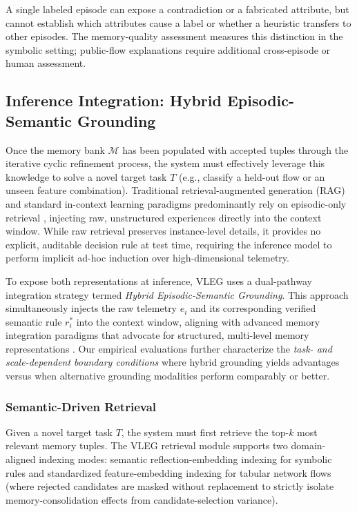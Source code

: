 \documentclass[journal]{IEEEtran}
\theoremstyle{definition}
\theoremstyle{remark}
\begin{document}
A single labeled episode can expose a contradiction or a fabricated attribute, but cannot establish which attributes cause a label or whether a heuristic transfers to other episodes. The memory-quality assessment measures this distinction in the symbolic setting; public-flow explanations require additional cross-episode or human assessment.

\subsection{Inference Integration: Hybrid Episodic-Semantic Grounding}
Once the memory bank $\mathcal{M}$ has been populated with accepted tuples through the iterative cyclic refinement process, the system must effectively leverage this knowledge to solve a novel target task $T$ (e.g., classify a held-out flow or an unseen feature combination). Traditional retrieval-augmented generation (RAG) and standard in-context learning paradigms predominantly rely on episodic-only retrieval \cite{lewis2020retrieval, zhang2022active}, injecting raw, unstructured experiences directly into the context window. While raw retrieval preserves instance-level details, it provides no explicit, auditable decision rule at test time, requiring the inference model to perform implicit ad-hoc induction over high-dimensional telemetry.

To expose both representations at inference, VLEG uses a dual-pathway integration strategy termed \textit{Hybrid Episodic-Semantic Grounding}. This approach simultaneously injects the raw telemetry $e_i$ and its corresponding verified semantic rule $r_i^*$ into the context window, aligning with advanced memory integration paradigms that advocate for structured, multi-level memory representations \cite{wu2025from, zhang2024survey}. Our empirical evaluations further characterize the \emph{task- and scale-dependent boundary conditions} where hybrid grounding yields advantages versus when alternative grounding modalities perform comparably or better.

\subsubsection{Semantic-Driven Retrieval}
Given a novel target task $T$, the system must first retrieve the top-$k$ most relevant memory tuples. The VLEG retrieval module supports two domain-aligned indexing modes: semantic reflection-embedding indexing for symbolic rules and standardized feature-embedding indexing for tabular network flows (where rejected candidates are masked without replacement to strictly isolate memory-consolidation effects from candidate-selection variance).
\end{document}
